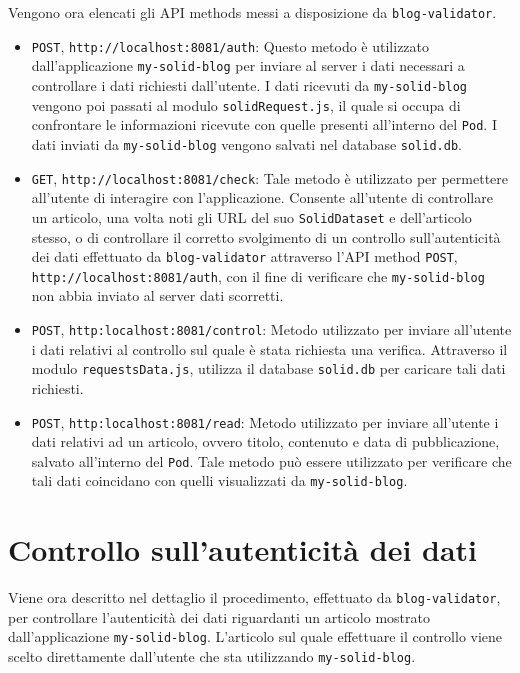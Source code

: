 \medskip

Vengono ora elencati gli API methods messi a disposizione da {\tt blog-validator}.

\begin{itemize}
	\item {\tt POST}, {\tt http://localhost:8081/auth}: Questo metodo è utilizzato dall'applicazione {\tt my-solid-blog} per inviare al server i dati necessari a controllare i dati richiesti dall'utente. I dati ricevuti da {\tt my-solid-blog} vengono poi passati al modulo {\tt solidRequest.js}, il quale si occupa di confrontare le informazioni ricevute con quelle presenti all'interno del {\tt Pod}. I dati inviati da {\tt my-solid-blog} vengono salvati nel database {\tt solid.db}.
	\item {\tt GET}, {\tt http://localhost:8081/check}: Tale metodo è utilizzato per permettere all'utente di interagire con l'applicazione. Consente all'utente di controllare un articolo, una volta noti gli URL del suo {\tt SolidDataset} e dell'articolo stesso, o di controllare il corretto svolgimento di un controllo sull'autenticità dei dati effettuato da {\tt blog-validator} attraverso l'API method {\tt POST}, {\tt http://localhost:8081/auth}, con il fine di verificare che {\tt my-solid-blog} non abbia inviato al server dati scorretti.
	\item {\tt POST}, {\tt http:localhost:8081/control}: Metodo utilizzato per inviare all'utente i dati relativi al controllo sul quale è stata richiesta una verifica. Attraverso il modulo {\tt requestsData.js}, utilizza il database {\tt solid.db} per caricare tali dati richiesti.
	\item {\tt POST}, {\tt http:localhost:8081/read}:  Metodo utilizzato per inviare all'utente i dati relativi ad un articolo, ovvero titolo, contenuto e data di pubblicazione, salvato all'interno del {\tt Pod}. Tale metodo può essere utilizzato per verificare che tali dati coincidano con quelli visualizzati da {\tt my-solid-blog}.
\end{itemize}

\bigskip

\section{Controllo sull'autenticità dei dati}

\medskip

Viene ora descritto nel dettaglio il procedimento, effettuato da {\tt blog-validator}, per controllare l'autenticità dei dati riguardanti un articolo mostrato dall'applicazione {\tt my-solid-blog}. L'articolo sul quale effettuare il controllo viene scelto direttamente dall'utente che sta utilizzando {\tt my-solid-blog}.

